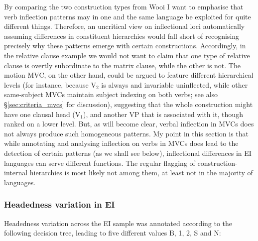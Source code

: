By comparing the two construction types from Wooi I want to emphasise that verb inflection patterns may in one and the same language be exploited for quite different things. Therefore, an uncritical view on inflectional loci automatically assuming differences in constituent hierarchies would fall short of recognising precisely why these patterns emerge with certain constructions. Accordingly, in the relative clause example we would not want to claim that one type of relative clause is overtly subordinate to the matrix clause, while the other is not. The motion MVC, on the other hand, could be argued to feature different hierarchical levels (for instance, because V$_2$ is always and invariable uninflected, while other same-subject MVCs maintain subject indexing on both verbs; see also §\ref{sec:criteria_mvcs} for discussion), suggesting that the whole construction might have one clausal head (V$_1$), and another VP that is associated with it, though ranked on a lower level. But, as will become clear, verbal inflection in MVCs does not always produce such homogeneous patterns. My point in this section is that while annotating and analysing inflection on verbs in MVCs does lead to the detection of certain patterns (as we shall see below), inflectional differences in EI languages can serve different functions. The regular flagging of construction-internal hierarchies is most likely not among them, at least not in the majority of languages.

\subsubsection{Headedness variation in EI}\label{sec:headednessEI}

Headedness variation across the EI sample was annotated according to the following decision tree, leading to five different values B, 1, 2, S and N:

